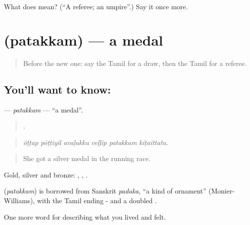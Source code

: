 \begin{tcolorbox}[breakable,colback=teal!4,colframe=teal!35!black,title={Before you move on}]
What does  mean? (\textquotedblleft{}A referee; an umpire\textquotedblright{}.) Say it once more.
\end{tcolorbox}
\section[\texorpdfstring{\ta{பதக்கம்} (patakkam)}{பதக்கம் (patakkam)}]{ (patakkam) — a medal}

\label{lesson:TA-C534-patakkam}



\begin{quote}
Before the new one: say the Tamil for a draw, then the Tamil for a referee.
\end{quote}

\subsection*{You'll want to know: }
\textbf{} — \emph{patakkam} — \textquotedblleft{}a medal\textquotedblright{}.

\begin{quote}
     .
\end{quote}

\begin{quote}
\emph{ōṭṭap pōṭṭiyil avaḷukku veḷḷip patakkam kiṭaittatu.}
\end{quote}

\begin{quote}
She got a silver medal in the running race.
\end{quote}

Gold, silver and bronze:  ,  ,  .

\begin{cousinweb}
\textbf{} (\emph{patakkam}) is borrowed from Sanskrit \emph{padaka}, \textquotedblleft{}a kind of ornament\textquotedblright{} (Monier-Williams), with the Tamil ending - and a doubled .
\end{cousinweb}

\begin{grammarlens}[title={What you've built}]
One more word for describing what you lived and felt.
\end{grammarlens}


